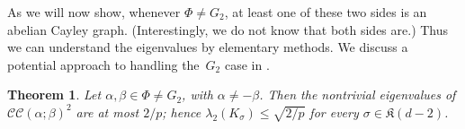 \documentclass[10pt,a4paper]{article}
\newtheorem{theorem}{Theorem}[section]
\newtheorem{proposition}[theorem]{Proposition}
\newtheorem{corollary}[theorem]{Corollary}
\theoremstyle{definition}
\newcommand{\calS}{\mathcal{S}}
\newcommand{\CC}[2]{\mathcal{C}\mathcal{C}(#1;#2)}
\newcommand{\Link}{\mathrm{Link}}
\newcommand{\complex}{\mathfrak{K}}
\begin{document}
As we will now show, whenever $\Phi \neq G_2$, at least one of these two sides is an abelian Cayley graph. (Interestingly, we do not know that both sides are.)  Thus we can understand the eigenvalues by elementary methods.  We discuss a potential approach to handling the~$G_2$ case in .

\begin{theorem}\label{thm:linkexpand}
        Let $\alpha, \beta \in \Phi \neq G_2$, with $\alpha \neq -\beta$. 
        Then the nontrivial eigenvalues of $\CC{\alpha}{\beta}^2$ are at most $2/p$; hence $\lambda_2(K_\sigma) \leq \sqrt{2/p}$ for every $\sigma \in \complex(d-2)$.
\end{theorem}
\end{document}
